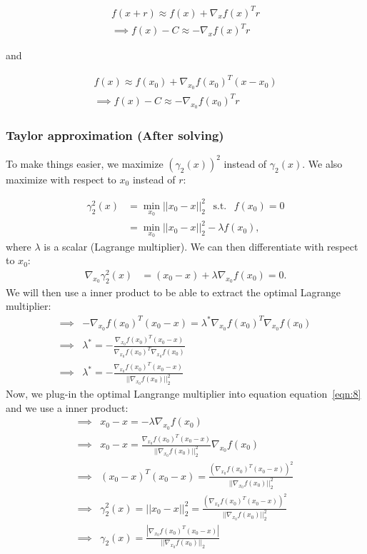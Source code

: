 \documentclass{article}
\def\eqref#1{equation~\ref{#1}}
\begin{document}
\begin{align*}
f(x+r) \approx f(x) + \nabla_x f(x)^T r \\
\implies f(x) - C \approx -\nabla_x f(x)^T r
\end{align*}

and 

\begin{align*}
f(x) \approx f(x_0) + \nabla_{x_0} f(x_0)^T (x-x_0) \\
\implies f(x) - C \approx -\nabla_{x_0} f(x_0)^T r
\end{align*}

\subsubsection{Taylor approximation (After solving)}

To make things easier, we maximize $(\gamma_2(x))^2$ instead of $\gamma_2(x)$. We also maximize with respect to $x_0$ instead of $r$:

\begin{align*}
\gamma^2_2(x) &= \min_{x_0} || x_0-x ||^2_2 \hspace{5pt} \text{ s.t. } \hspace{5pt} f(x_0)=0 \\
&= \min_{x_0} || x_0-x ||^2_2 - \lambda f(x_0),
\end{align*}
where $\lambda$ is a scalar (Lagrange multiplier).
We can then differentiate with respect to $x_0$:
\begin{align}\label{eqn:8}
\nabla_{x_0} \gamma^2_2(x)  &= (x_0-x) + \lambda \nabla_{x_0} f(x_0) = 0.
\end{align}
We will then use a inner product to be able to extract the optimal Lagrange multiplier:
\begin{align*}
\implies& -\nabla_{x_0} f(x_0)^T (x_0-x) = \lambda^{*} \nabla_{x_0} f(x_0)^T \nabla_{x_0} f(x_0) \\
\implies& \lambda^{*} = -\frac{\nabla_{x_0} f(x_0)^T (x_0-x)}{\nabla_{x_0} f(x_0)^T \nabla_{x_0} f(x_0)} \\
\implies& \lambda^{*} = -\frac{\nabla_{x_0} f(x_0)^T (x_0-x) }{|| \nabla_{x_0} f(x_0) ||^2_2} 
\end{align*}
Now, we plug-in the optimal Langrange multiplier into equation \eqref{eqn:8} and we use a inner product:
\begin{align*}
\implies& x_0-x = -\lambda \nabla_{x_0} f(x_0) \\
\implies& x_0-x = \frac{\nabla_{x_0} f(x_0)^T (x_0-x) }{|| \nabla_{x_0} f(x_0) ||^2_2} \nabla_{x_0} f(x_0) \\
\implies& (x_0-x)^T (x_0-x) = \frac{\left( \nabla_{x_0} f(x_0)^T (x_0-x) \right)^2 }{|| \nabla_{x_0} f(x_0) ||^2_2} \\
\implies& \gamma^2_2(x) = || x_0 - x ||^2_2 = \frac{\left( \nabla_{x_0} f(x_0)^T (x_0-x) \right)^2 }{|| \nabla_{x_0} f(x_0) ||^2_2} \\
\implies&  \gamma_2(x) = \frac{\left| \nabla_{x_0} f(x_0)^T (x_0-x) \right|}{|| \nabla_{x_0} f(x_0) ||_2} \\
\end{align*}
\end{document}
